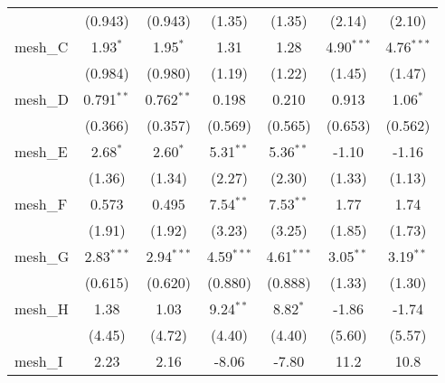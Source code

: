\begin{tabular}{lcccccc}
                                                               & (0.943)        & (0.943)        & (1.35)        & (1.35)        & (2.14)        & (2.10)\\   
   mesh\_C                                                     & 1.93$^{*}$     & 1.95$^{*}$     & 1.31          & 1.28          & 4.90$^{***}$  & 4.76$^{***}$\\   
                                                               & (0.984)        & (0.980)        & (1.19)        & (1.22)        & (1.45)        & (1.47)\\   
   mesh\_D                                                     & 0.791$^{**}$   & 0.762$^{**}$   & 0.198         & 0.210         & 0.913         & 1.06$^{*}$\\   
                                                               & (0.366)        & (0.357)        & (0.569)       & (0.565)       & (0.653)       & (0.562)\\   
   mesh\_E                                                     & 2.68$^{*}$     & 2.60$^{*}$     & 5.31$^{**}$   & 5.36$^{**}$   & -1.10         & -1.16\\   
                                                               & (1.36)         & (1.34)         & (2.27)        & (2.30)        & (1.33)        & (1.13)\\   
   mesh\_F                                                     & 0.573          & 0.495          & 7.54$^{**}$   & 7.53$^{**}$   & 1.77          & 1.74\\   
                                                               & (1.91)         & (1.92)         & (3.23)        & (3.25)        & (1.85)        & (1.73)\\   
   mesh\_G                                                     & 2.83$^{***}$   & 2.94$^{***}$   & 4.59$^{***}$  & 4.61$^{***}$  & 3.05$^{**}$   & 3.19$^{**}$\\   
                                                               & (0.615)        & (0.620)        & (0.880)       & (0.888)       & (1.33)        & (1.30)\\   
   mesh\_H                                                     & 1.38           & 1.03           & 9.24$^{**}$   & 8.82$^{*}$    & -1.86         & -1.74\\   
                                                               & (4.45)         & (4.72)         & (4.40)        & (4.40)        & (5.60)        & (5.57)\\   
   mesh\_I                                                     & 2.23           & 2.16           & -8.06         & -7.80         & 11.2          & 10.8\\   

\end{tabular}
